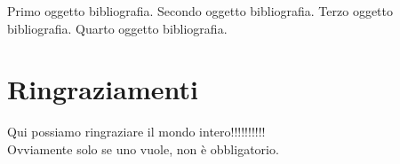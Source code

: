 \documentclass[12pt,a4paper,openright,twoside]{report}
\begin{document}

\clearpage{\pagestyle{empty}\cleardoublepage}

\clearpage{\pagestyle{empty}\cleardoublepage}

\clearpage{\pagestyle{empty}\cleardoublepage}

\tableofcontents                        %

\clearpage{\pagestyle{empty}\cleardoublepage}
\listoffigures                          %
\clearpage{\pagestyle{empty}\cleardoublepage}








\clearpage{\pagestyle{empty}\cleardoublepage}

\begin{thebibliography}{90}             %
\rhead[\fancyplain{}{\bfseries \leftmark}]{\fancyplain{}{\bfseries
\thepage}}
 Primo oggetto bibliografia.
 Secondo oggetto bibliografia.
 Terzo oggetto bibliografia.
 Quarto oggetto bibliografia.
\end{thebibliography}
\clearpage{\pagestyle{empty}\cleardoublepage}
\chapter*{Ringraziamenti}
\thispagestyle{empty}
Qui possiamo ringraziare il mondo intero!!!!!!!!!!\\
Ovviamente solo se uno vuole, non \`e obbligatorio.
\end{document}
